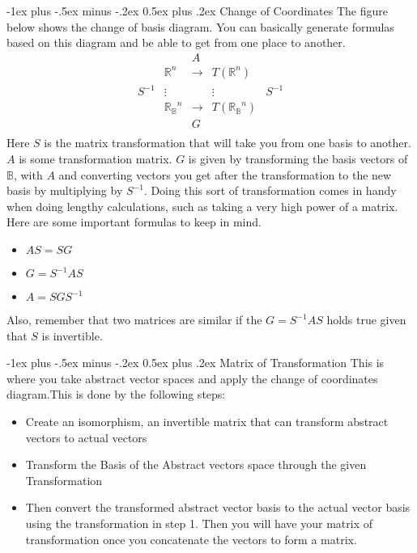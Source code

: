 \documentclass[10pt,landscape]{article}
\makeatletter
\renewcommand{\section}{\@startsection{section}{1}{0mm}%
                                {-1ex plus -.5ex minus -.2ex}%
                                {0.5ex plus .2ex}%
                                {\normalfont\large\bfseries}}
\makeatother
\begin{document}
\begin{multicols}{3}
\section{Change of Coordinates}
The figure below shows the change of basis diagram. You can basically generate formulas based on this diagram and be able to get from one place to another.
\begin{equation*}
    \begin{matrix}{}
    &&A\\
    &\mathbb{R}^n&\longrightarrow&T(\mathbb{R}^n)\\
    S^{-1}&\vdots& &\vdots&S^{-1}\\
   & \mathbb{R_B}^n&\longrightarrow&T(\mathbb{R_B}^n)\\
   &&G\\
    \end{matrix}
\end{equation*}{}
Here $S$ is the matrix transformation that will take you from one basis to another. $A$ is some transformation matrix. $G$ is given by transforming the basis vectors of $\mathbb{B}$, with $A$ and converting vectors you get after the transformation to the new basis by multiplying by $S^{-1}$. Doing this sort of transformation comes in handy when doing lengthy calculations, such as taking a very high power of a matrix. 
Here are some important formulas to keep in mind. 
\begin{itemize}
    \item $AS=SG$
    \item $G=S^{-1}AS$
    \item $A=SGS^{-1}$
\end{itemize}{}
Also, remember that two matrices are similar if the $G=S^{-1}AS$ holds true given that $S$ is invertible.

\section{Matrix of Transformation}
This is where you take abstract vector spaces and apply the change of coordinates diagram.This is done by the following steps:
\begin{itemize}
    \item[1] Create an isomorphism, an invertible matrix that can transform abstract vectors to actual vectors
    \item[2] Transform the Basis of the Abstract vectors space through the given Transformation
    \item[3] Then convert the transformed abstract vector basis to the actual vector basis using the transformation in step 1. Then you will have your matrix of transformation once you concatenate the vectors to form a matrix.
\end{itemize}{}


\end{multicols}
\end{document}
